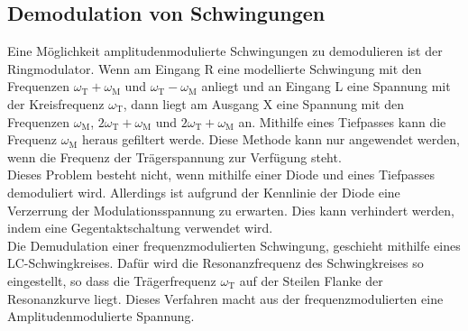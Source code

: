 \subsection{Demodulation von Schwingungen}
Eine Möglichkeit amplitudenmodulierte Schwingungen zu demodulieren ist der Ringmodulator.
Wenn am Eingang R eine modellierte Schwingung mit den Frequenzen $\omega_\text{T}+\omega_\text{M} $ und $\omega_\text{T}-\omega_\text{M}$ anliegt und an Eingang L eine Spannung mit der Kreisfrequenz $\omega_\text{T}$, dann liegt am Ausgang X eine Spannung mit den Frequenzen $\omega_\text{M}$, $2\omega_\text{T}+\omega_\text{M} $ und $2\omega_\text{T}+\omega_\text{M} $ an.
Mithilfe eines Tiefpasses kann die Frequenz $\omega_\text{M}$ heraus gefiltert werde. Diese Methode kann nur angewendet werden, wenn die Frequenz der Trägerspannung zur Verfügung steht.\\
Dieses Problem besteht nicht, wenn mithilfe einer Diode und eines Tiefpasses demoduliert wird.
Allerdings ist aufgrund der Kennlinie der Diode eine Verzerrung der Modulationsspannung zu erwarten.
Dies kann verhindert werden, indem eine Gegentaktschaltung verwendet wird.\\
Die Demudulation einer frequenzmodulierten Schwingung, geschieht mithilfe eines LC-Schwingkreises. Dafür wird die Resonanzfrequenz des Schwingkreises so eingestellt, so dass die Trägerfrequenz $\omega_\text{T}$ auf der Steilen Flanke der Resonanzkurve liegt. Dieses Verfahren macht aus der frequenzmodulierten eine Amplitudenmodulierte Spannung.
\newpage
